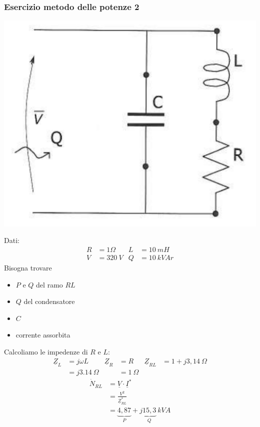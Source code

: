 \documentclass{article}
\begin{document}
\subsubsection{Esercizio metodo delle potenze 2}
\begin{center}
    \includegraphics[scale=0.27]{Image/Esercizio_potenze_2.png}
\end{center}
Dati:
\begin{align*}
    R &= 1 \Omega & L &= 10\ mH \\
    V &= 320 \ V & Q &= 10 \ kVAr
\end{align*}
Bisogna trovare
\begin{itemize}
    \item $P$ e $Q$ del ramo $RL$
    \item $Q$ del condensatore
    \item $C$
    \item corrente assorbita
\end{itemize}
Calcoliamo le impedenze di $R$ e $L$:
\begin{align*}
    \underline{Z}_L &= j \omega L & 
    \underline{Z}_R &= R &
    \underline{Z}_{RL} &= 1 + j 3,14 \ \Omega
    \\
    &= j3.14 \  \Omega &
    &= 1 \ \Omega
\end{align*}
\begin{align*}
    \dot N_{RL} &= \underline{V} \cdot \underline{I}^*
    \\
    &= \frac{V^2}{\underline{Z}_{RL}^*}
    \\
    &= \underbrace{4,87}_{P} + j\underbrace{15,3}_{Q} \ kVA
\end{align*}
\end{document}
